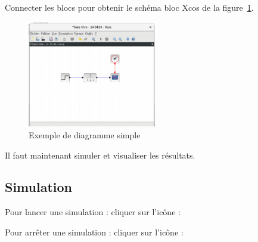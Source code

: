 Connecter les blocs pour obtenir le schéma bloc Xcos de la 
figure~\ref{fig-simple}.
\begin{figure}
    \centering
    \includegraphics[width=0.5\textwidth]{fig/diagramme_simple.eps}
    \caption{Exemple de diagramme simple\label{fig-simple}}
\end{figure}
Il faut maintenant simuler et visualiser les résultats.  
\subsection{Simulation}
Pour lancer une simulation : cliquer sur l'icône : 

Pour arrêter une simulation : cliquer sur l'icône : 

